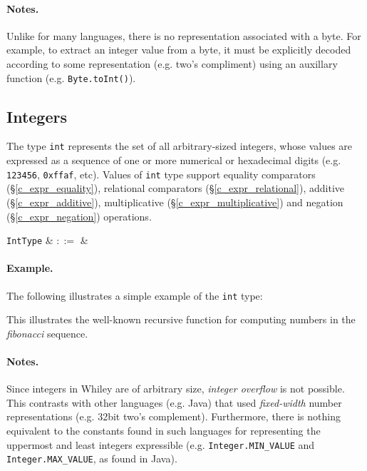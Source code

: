 \paragraph{Notes.}  Unlike for many languages, there is no representation associated with a byte. For example, to extract an integer value from a byte, it must be explicitly decoded according to some representation (e.g. two's compliment) using an auxillary function (e.g. \lstinline{Byte.toInt()}).



\subsection{Integers}
\label{c_types_int}

The type \lstinline{int} represents the set of all arbitrary-sized integers, whose values are expressed as a sequence of one or more numerical or hexadecimal digits (e.g. \lstinline{123456}, \lstinline{0xffaf}, etc).  Values of \lstinline{int} type support equality comparators (\S\ref{c_expr_equality}), relational comparators (\S\ref{c_expr_relational}), additive (\S\ref{c_expr_additive}), multiplicative (\S\ref{c_expr_multiplicative}) and negation (\S\ref{c_expr_negation}) operations.


\begin{syntax}
  \verb+IntType+ & $::=$ &  \\
\end{syntax}

\paragraph{Example.} The following illustrates a simple example of the \lstinline{int} type:



This illustrates the well-known recursive function for computing numbers in the {\em fibonacci} sequence.

\paragraph{Notes.}  Since integers in Whiley are of arbitrary size, {\em integer overflow} is not possible.  This contrasts with other languages (e.g. Java) that used {\em fixed-width} number representations (e.g. 32bit two's complement).  Furthermore, there is nothing equivalent to the constants found in such languages for representing the uppermost and least integers expressible (e.g. \lstinline{Integer.MIN_VALUE} and \lstinline{Integer.MAX_VALUE}, as found in Java).

